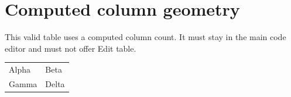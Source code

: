 \documentclass{article}
\newcommand{\colcount}{2}
\begin{document}
\section*{Computed column geometry}
This valid table uses a computed column count. It must stay in the main code
editor and must not offer Edit table.

\begin{tabular}{*{\colcount}{l}}
Alpha & Beta \\
Gamma & Delta \\
\end{tabular}
\end{document}
